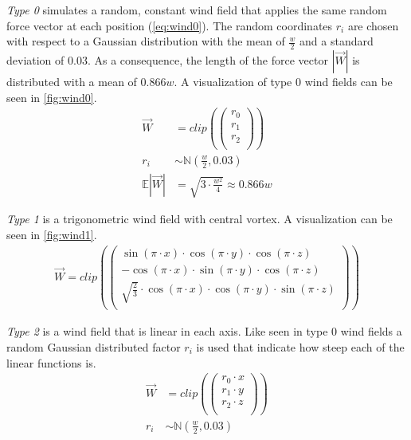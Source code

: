 \newline
\emph{Type 0} simulates a random, constant wind field that applies the same random force vector at each position (\cref{eq:wind0}). The random coordinates $r_i$ are chosen with respect to a Gaussian distribution with the mean of $\frac{w}{2}$ and a standard deviation of $0.03$. As a consequence, the length of the force vector $|\overrightarrow{W}|$ is distributed with a mean of $0.866w$. A visualization of type 0 wind fields can be seen in \cref{fig:wind0}.
\begin{align} \label{eq:wind0}
	\overrightarrow{W} &= clip(\left(
	\begin{array}{c}
		r_0\\
		r_1\\
		r_2\\
	\end{array}
	\right))\\
	r_i &\sim \mathbb{N}(\frac{w}{2}, 0.03)\\
	\mathbb{E}|\overrightarrow{W}| &= \sqrt{3 \cdot \frac{w^2}{4}} \approx 0.866 w
\end{align}

\newpage

\emph{Type 1} is a trigonometric wind field with central vortex. A visualization can be seen in \cref{fig:wind1}.
\begin{align} \label{eq:wind1}
	\overrightarrow{W} = clip(\left(
	\begin{array}{c}
		\sin(\pi \cdot x) \cdot \cos(\pi \cdot y) \cdot \cos(\pi \cdot z)\\
		- \cos(\pi \cdot x) \cdot \sin(\pi \cdot y) \cdot \cos(\pi \cdot z)\\
		\sqrt{\frac{2}{3}} \cdot \cos(\pi \cdot x) \cdot \cos(
		\pi \cdot y) \cdot \sin(\pi \cdot z)\\
	\end{array}
	\right))
\end{align}
\newline

\emph{Type 2} is a wind field that is linear in each axis. Like seen in type 0 wind fields a random Gaussian distributed factor $r_i$ is used that indicate how steep each of the linear functions is.
\begin{align}
	\overrightarrow{W} &= clip(\left(
	\begin{array}{c}
		r_0 \cdot x\\
		r_1 \cdot y\\
		r_2 \cdot z\\
	\end{array}
	\right))\\
	r_i &\sim \mathbb{N}(\frac{w}{2}, 0.03)
\end{align}
\newline

